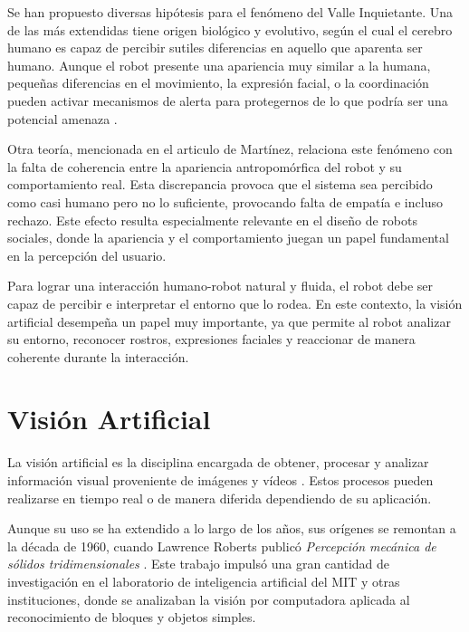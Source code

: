 Se han propuesto diversas hipótesis para el fenómeno del Valle Inquietante. Una de las más extendidas tiene origen biológico y evolutivo, según el cual el cerebro humano es capaz de percibir sutiles diferencias en aquello que aparenta ser humano. Aunque el robot presente una apariencia muy similar a la humana, pequeñas diferencias en el movimiento, la expresión facial, o la coordinación pueden activar mecanismos de alerta para protegernos de lo que podría ser una potencial amenaza \cite{hri3}.

\vspace{0.5cm}

Otra teoría, mencionada en el articulo de Martínez, relaciona este fenómeno con la falta de coherencia entre la apariencia antropomórfica del robot y su comportamiento real. Esta discrepancia provoca que el sistema sea percibido como casi humano pero no lo suficiente, provocando falta de empatía e incluso rechazo.
Este efecto resulta especialmente relevante en el diseño de robots sociales, donde la apariencia y el comportamiento juegan un papel fundamental en la percepción del usuario.

\vspace{0.5cm}

Para lograr una interacción humano-robot natural y fluida, el robot debe ser capaz de percibir e interpretar el entorno que lo rodea. En este contexto, la visión artificial desempeña un papel muy importante, ya que permite al robot analizar su entorno, reconocer rostros, expresiones faciales y reaccionar de manera coherente durante la interacción.

\vspace{0.5cm}

\section{Visión Artificial}
\label{sec:Vision Artificial}

La visión artificial es la disciplina encargada de obtener, procesar y analizar información visual proveniente de imágenes y vídeos . Estos procesos pueden realizarse en tiempo real o de manera diferida dependiendo de su aplicación.

\vspace{0.5cm}

Aunque su uso se ha extendido a lo largo de los años, sus orígenes se remontan a la década de 1960, cuando Lawrence Roberts publicó \textit{Percepción mecánica de sólidos tridimensionales} \cite{visionbook}. Este trabajo impulsó una gran cantidad de investigación en el laboratorio de inteligencia artificial del MIT y otras instituciones, donde se analizaban la visión por computadora aplicada al reconocimiento de bloques y objetos simples. 

